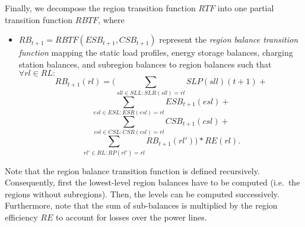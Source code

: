 Finally, we decompose the region transition function $RTF$ into one partial transition function $RBTF$, where
\begin{itemize}
	\item $RB_{t+1} = RBTF(ESB_{t+1}, CSB_{t+1})$ represent the \textit{region balance transition function} mapping the static load profiles, energy storage balances, charging station balances, and subregion balances to region balances such that $\forall rl \in RL:$
	\[
		RB_{t+1}(rl) = (\sum_{sll \in SLL: SLR(sll) = rl} SLP(sll)(t+1) +
	\]
	\[
		\sum_{esl \in ESL: ESR(esl) = rl} ESB_{t+1}(esl) +
	\]
	\[
		\sum_{csl \in CSL: CSR(csl) = rl} CSB_{t+1}(csl) +
	\]
	\[
		\sum_{rl' \in RL: RP(rl') = rl} RB_{t+1}(rl')) * RE(rl) \textrm{.}
	\]
\end{itemize}
Note that the region balance transition function is defined recursively. Consequently, first the lowest-level region balances have to be computed (i.e.\ the regions without subregions). Then, the levels can be computed successively. Furthermore, note that the sum of sub-balances is multiplied by the region efficiency $RE$ to account for losses over the power lines.